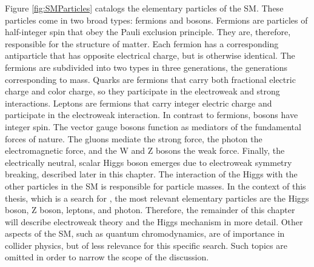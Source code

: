 Figure \ref{fig:SMParticles} catalogs the elementary particles of the SM. These particles come in two broad types: fermions and bosons. Fermions are particles of half-integer spin that obey 
the Pauli exclusion principle. They are, therefore, responsible for the structure of matter. 
Each fermion has a corresponding antiparticle that has opposite electrical charge, but is otherwise identical. 
The fermions are subdivided into two types in three generations, the generations corresponding to mass.
Quarks are fermions that carry both fractional electric charge and color charge, so they participate in the electroweak and strong interactions. 
Leptons are fermions that carry integer electric charge and participate in the electroweak interaction.
In contrast to fermions, bosons have integer spin. The vector gauge bosons function as mediators of the fundamental forces of nature. 
The gluons mediate the strong force, the photon the electromagnetic force, and the W and Z bosons the weak force. 
Finally, the electrically neutral, scalar Higgs boson emerges due to electroweak symmetry breaking, described later in this chapter. The interaction of the Higgs 
with the other particles in the SM is responsible for particle masses. 
In the context of this thesis, which is a search for \hzg{}, the most relevant elementary particles are the Higgs boson, Z boson, leptons, and photon. 
Therefore, the remainder of this chapter will describe electroweak theory and the Higgs mechanism in more detail. Other aspects of the SM, such as quantum chromodynamics, 
are of importance in collider physics, but of less relevance for this specific search. Such topics are omitted in order to narrow the scope of the discussion.

